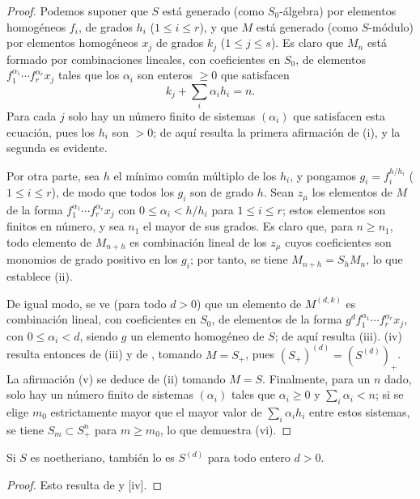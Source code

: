 \documentclass[oneside,10pt]{amsart}
\renewcommand{\leq}{\leqslant}
\renewcommand{\geq}{\geqslant}
\newcommand{\oldpage}[2][]{\marginnote{\normalfont\footnotesize\textbf{#1}~|~#2}\ignorespaces}
\let\EGAOriginalLabel\label
\renewcommand{\label}[1]{\phantomsection\EGAOriginalLabel{#1}}
\begin{document}
\begin{proof}
Podemos suponer que $S$ está generado (como $S_0$-álgebra) por elementos homogéneos $f_i$, de grados $h_i$ ($1\leq i\leq r$), y que $M$ está generado (como $S$-módulo) por elementos homogéneos $x_j$ de grados $k_j$ ($1\leq j\leq s$).
Es claro que $M_n$ está formado por combinaciones lineales,
\oldpage[II]{22}
con coeficientes en $S_0$, de elementos $f_1^{\alpha_1}\cdots f_r^{\alpha_r}x_j$ tales que los $\alpha_i$ son enteros $\geq0$ que satisfacen
\[
  k_j+\sum_i\alpha_i h_i=n.
\]
Para cada $j$ solo hay un número finito de sistemas $(\alpha_i)$ que satisfacen esta ecuación, pues los $h_i$ son $>0$; de aquí resulta la primera afirmación de (i), y la segunda es evidente.

Por otra parte, sea $h$ el mínimo común múltiplo de los $h_i$, y pongamos $g_i=f_i^{h/h_i}$ ($1\leq i\leq r$), de modo que todos los $g_i$ son de grado $h$.
Sean $z_\mu$ los elementos de $M$ de la forma $f_1^{\alpha_1}\cdots f_r^{\alpha_r}x_j$ con $0\leq\alpha_i<h/h_i$ para $1\leq i\leq r$; estos elementos son finitos en número, y sea $n_1$ el mayor de sus grados.
Es claro que, para $n\geq n_1$, todo elemento de $M_{n+h}$ es combinación lineal de los $z_\mu$ cuyos coeficientes son monomios de grado positivo en los $g_i$; por tanto, se tiene $M_{n+h}=S_hM_n$, lo que establece (ii).

De igual modo, se ve (para todo $d>0$) que un elemento de $M^{(d,k)}$ es combinación lineal, con coeficientes en $S_0$, de elementos de la forma $g^d f_1^{\alpha_1}\cdots f_r^{\alpha_r}x_j$, con $0\leq\alpha_i<d$, siendo $g$ un elemento homogéneo de $S$; de aquí resulta (iii).
(iv) resulta entonces de (iii) y de , tomando $M=S_+$, pues $(S_+)^{(d)}=(S^{(d)})_+$.
La afirmación (v) se deduce de (ii) tomando $M=S$.
Finalmente, para un $n$ dado, solo hay un número finito de sistemas $(\alpha_i)$ tales que $\alpha_i\geq0$ y $\sum_i\alpha_i<n$; si se elige $m_0$ estrictamente mayor que el mayor valor de $\sum_i\alpha_i h_i$ entre estos sistemas, se tiene $S_m\subset S_+^n$ para $m\geq m_0$, lo que demuestra (vi).
\end{proof}

\begin{corollary}[2.1.7]
\label{II.2.1.7}
Si $S$ es noetheriano, también lo es $S^{(d)}$ para todo entero $d>0$.
\end{corollary}

\begin{proof}
Esto resulta de  y [iv].
\end{proof}
\end{document}
